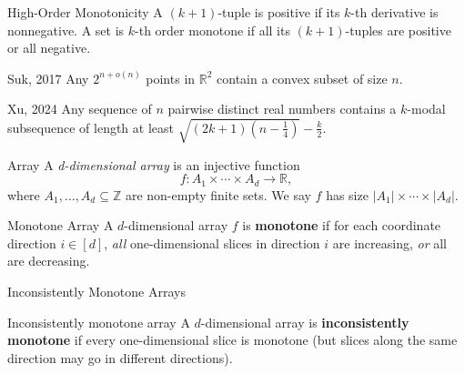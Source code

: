 \begin{frame}
    \begin{theorem}{High-Order Monotonicity}
        A $(k+1)$-tuple is positive if its $k$-th derivative is nonnegative. A set is $k$-th order monotone if all its $(k+1)$-tuples are positive or all negative.
    \end{theorem}
    \begin{theorem}{Suk, 2017}
        Any $2^{n+o(n)}$ points in $\mathbb{R}^2$ contain a convex subset of size $n$.
    \end{theorem}
    \begin{theorem}{Xu, 2024}
        Any sequence of $n$ pairwise distinct real numbers contains a $k$-modal subsequence of length at least $\sqrt{(2k + 1)(n - \frac{1}{4})} - \frac{k}{2}$.
    \end{theorem}

\end{frame}

\begin{frame}{}
  \begin{ffact}{Array}
    A \textit{d-dimensional array} is an injective function
    \[
      f : A_1 \times \cdots \times A_d \to \mathbb{R},
    \]
    where \( A_1, \ldots, A_d \subseteq \mathbb{Z} \) are non-empty finite sets.
    We say \( f \) has size \( |A_1| \times \cdots \times |A_d| \).
  \end{ffact}
    \pause
  \medskip
  \begin{ffact}{Monotone Array}
    A \( d \)-dimensional array \( f \) is \textbf{monotone} if for each
    coordinate direction \( i \in [d] \), \emph{all} one-dimensional slices
    in direction \( i \) are increasing, \emph{or} all are decreasing.
  \end{ffact}
\end{frame}

\begin{frame}{Inconsistently Monotone Arrays}
  \begin{ffact}{Inconsistently monotone array}
    A \( d \)-dimensional array is \textbf{inconsistently monotone} if every
    one-dimensional slice is monotone (but slices along the same direction
    may go in different directions).
  \end{ffact}
\end{frame}



